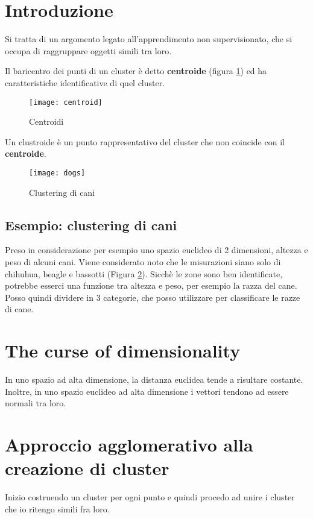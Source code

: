 \documentclass[\main/main.tex]{subfiles}
\begin{document}
\section{Introduzione}

Si tratta di un argomento legato all'apprendimento non supervisionato, che si occupa di raggruppare oggetti simili tra loro.

\begin{definition}[Centroide]
  Il baricentro dei punti di un cluster è detto \textbf{centroide} (figura \ref{centroids}) ed ha caratteristiche identificative di quel cluster.
  \begin{figure}
    \texttt{[image: centroid]}
    \caption{Centroidi}
    \label{centroids}
  \end{figure}
\end{definition}

\begin{definition}[Clustroide]
  Un clustroide è un punto rappresentativo del cluster che non coincide con il \textbf{centroide}.
\end{definition}

\begin{figure}
  \texttt{[image: dogs]}
  \caption{Clustering di cani}
  \label{dog}
\end{figure}

\subsection{Esempio: clustering di cani}
Preso in considerazione per esempio uno spazio euclideo di 2 dimensioni, altezza e peso di alcuni cani. Viene considerato noto che le misurazioni siano solo di chihuhua, beagle e bassotti (Figura \ref{dog}).
Sicchè le zone sono ben identificate, potrebbe esserci una funzione tra altezza e peso, per esempio la razza del cane. Posso quindi dividere in 3 categorie, che posso utilizzare per classificare le razze di cane.

\section{The curse of dimensionality}
In uno spazio ad alta dimensione, la distanza euclidea tende a risultare costante. Inoltre, in uno spazio euclideo ad alta dimensione i vettori tendono ad essere normali tra loro.

\section{Approccio agglomerativo alla creazione di cluster}
Inizio costruendo un cluster per ogni punto e quindi procedo ad unire i cluster che io ritengo simili fra loro.
\end{document}
